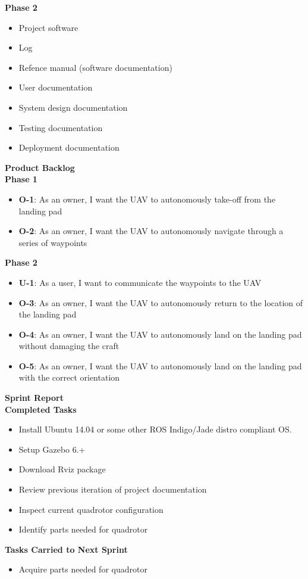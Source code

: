 \normalsize{\textbf{Phase 2}}
\begin{itemize}
\item Project software
\item Log
\item Refence manual (software documentation)
\item User documentation
\item System design documentation
\item Testing documentation
\item Deployment documentation
\end{itemize}
\vspace{6mm}
\Large{\textbf{Product Backlog}}
\\[-3mm]\noindent\makebox[\linewidth]{\rule{\textwidth}{0.4pt}}
\normalsize{\textbf{Phase 1}}
\begin{itemize}
\item \textbf{O-1}: As an owner, I want the UAV to autonomously take-off from the landing pad
\item \textbf{O-2}: As an owner, I want the UAV to autonomously navigate through a series of waypoints
\end{itemize}
\vspace{3mm}
\normalsize{\textbf{Phase 2}}
\begin{itemize}
\item \textbf{U-1}: As a user, I want to communicate the waypoints to the UAV
\item \textbf{O-3}: As an owner, I want the UAV to autonomously return to the location of the landing pad
\item \textbf{O-4}: As an owner, I want the UAV to autonomously land on the landing pad without damaging the craft
\item \textbf{O-5}: As an owner, I want the UAV to autonomously land on the landing pad with the correct orientation
\end{itemize}
\vspace{6mm}
\Large{\textbf{Sprint Report}}
\\[-3mm]\noindent\makebox[\linewidth]{\rule{\textwidth}{0.4pt}}
\normalsize{\textbf{Completed Tasks}}
\begin{itemize}
\item Install Ubuntu 14.04 or some other ROS Indigo/Jade distro compliant OS.
\item Setup Gazebo 6.+
\item Download Rviz package
\item Review previous iteration of project documentation
\item Inspect current quadrotor configuration
\item Identify parts needed for quadrotor
\end{itemize}
\vspace{3mm}
\normalsize{\textbf{Tasks Carried to Next Sprint}}
\begin{itemize}
\item Acquire parts needed for quadrotor
\end{itemize}
\vspace{6mm}